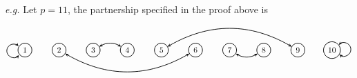 \vspace*{1em}

\emph{e.g.} Let $p = 11$, the partnership specified in the proof above is
\[\begin{tikzpicture}[<->,>=stealth,auto,node distance=1.5cm,
  thick,main node/.style={circle,draw}]

  \node[main node] (1) {$1$};
  \draw[]	([shift=(40:-0.35cm)]1) arc (140:-135:-3mm) node[] {} (1);

  \node[main node] (2) [right of=1] {$2$};
  \node[main node] (3) [right of=2] {$3$};
  \node[main node] (4) [right of=3] {$4$};
  \node[main node] (5) [right of=4] {$5$};
  \node[main node] (6) [right of=5] {$6$};
  \node[main node] (7) [right of=6] {$7$};
  \node[main node] (8) [right of=7] {$8$};
  \node[main node] (9) [right of=8] {$9$};
  \node[main node] (10) [right of=9] {$10$};
\draw[]	(10.37) arc (138:-130:3mm) node[] {} (10);
  \path[every node/.style={font=\sffamily\small}]
    (2) edge[bend right] node[] {} (6)
    (5) edge[bend left] node[] {} (9)
    (3) edge[bend left] node[] {} (4)
    (7) edge[bend right] node[] {} (8);
\end{tikzpicture}\]

\vspace*{1.5em}

